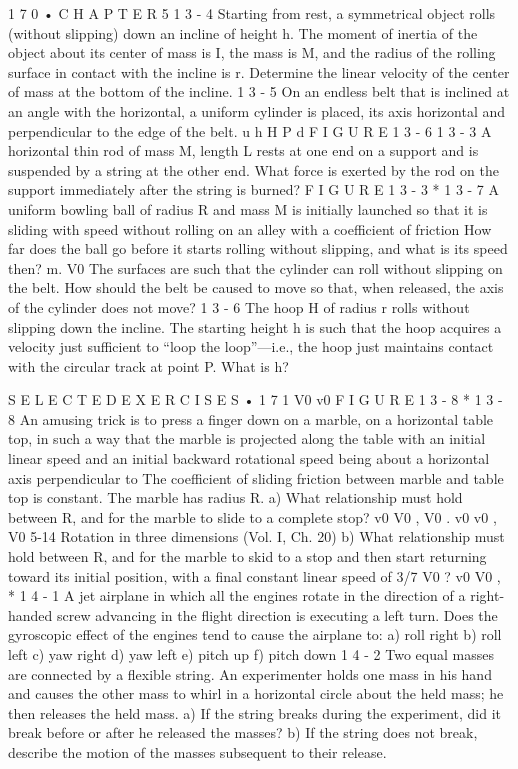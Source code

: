 \documentclass[10pt,oneside]{article}
\begin{document}
1 7 0 • C H A P T E R  5 \emph{ } 1 3 - 4 Starting from rest, a symmetrical object rolls (without slipping) down an incline of height h. The moment of inertia of the object about its center of mass is I, the mass is M, and the radius of the rolling surface in contact with the incline is r. Determine the linear velocity of the center of mass at the bottom of the incline. \emph{ } 1 3 - 5 On an endless belt that is inclined at an angle with the horizontal, a uniform cylinder is placed, its axis horizontal and perpendicular to the edge of the belt. u h H P d F I G U R E  1 3 - 6 \emph{ } 1 3 - 3 A horizontal thin rod of mass M, length L rests at one end on a support and is suspended by a string at the other end. What force is exerted by the rod on the support immediately after the string is burned? F I G U R E  1 3 - 3 \emph{ } * 1 3 - 7 A uniform bowling ball of radius R and mass M is initially launched so that it is sliding with speed without rolling on an alley with a coefficient of friction How far does the ball go before it starts rolling without slipping, and what is its speed then? m. V0 The surfaces are such that the cylinder can roll without slipping on the belt. How should the belt be caused to move so that, when released, the axis of the cylinder does not move? \emph{ } 1 3 - 6 The hoop H of radius r rolls without slipping down the incline. The starting height h is such that the hoop acquires a velocity just sufficient to “loop the loop”---i.e., the hoop just maintains contact with the circular track at point P. What is h?\par

S E L E C T E D  E X E R C I S E S • 1 7 1 V0 v0 F I G U R E  1 3 - 8 \emph{ } * 1 3 - 8 An amusing trick is to press a finger down on a marble, on a horizontal table top, in such a way that the marble is projected along the table with an initial linear speed and an initial backward rotational speed being about a horizontal axis perpendicular to The coefficient of sliding friction between marble and table top is constant. The marble has radius R. a) What relationship must hold between R, and for the marble to slide to a complete stop? v0 V0 , V0 . v0 v0 , V0 5-14 Rotation in three dimensions (Vol. I, Ch. 20) b) What relationship must hold between R, and for the marble to skid to a stop and then start returning toward its initial position, with a final constant linear speed of 3/7 V0 ? v0 V0 , * 1 4 - 1 A jet airplane in which all the engines rotate in the direction of a right-handed screw advancing in the flight direction is executing a left turn. Does the gyroscopic effect of the engines tend to cause the airplane to: a) roll right b) roll left c) yaw right d) yaw left e) pitch up f) pitch down \emph{ } 1 4 - 2 Two equal masses are connected by a flexible string. An experimenter holds one mass in his hand and causes the other mass to whirl in a horizontal circle about the held mass; he then releases the held mass. a) If the string breaks during the experiment, did it break before or after he released the masses? b) If the string does not break, describe the motion of the masses subsequent to their release.\par
\end{document}
